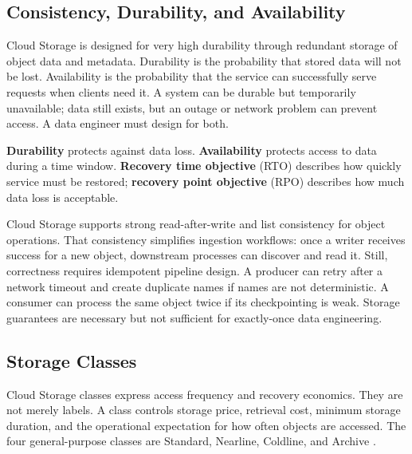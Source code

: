 \subsection{Consistency, Durability, and Availability}
Cloud Storage is designed for very high durability through redundant storage of object data and metadata. Durability is the probability that stored data will not be lost. Availability is the probability that the service can successfully serve requests when clients need it. A system can be durable but temporarily unavailable; data still exists, but an outage or network problem can prevent access. A data engineer must design for both.

\begin{definitionbox}
\textbf{Durability} protects against data loss. \textbf{Availability} protects access to data during a time window. \textbf{Recovery time objective} (RTO) describes how quickly service must be restored; \textbf{recovery point objective} (RPO) describes how much data loss is acceptable.
\end{definitionbox}

Cloud Storage supports strong read-after-write and list consistency for object operations. That consistency simplifies ingestion workflows: once a writer receives success for a new object, downstream processes can discover and read it. Still, correctness requires idempotent pipeline design. A producer can retry after a network timeout and create duplicate names if names are not deterministic. A consumer can process the same object twice if its checkpointing is weak. Storage guarantees are necessary but not sufficient for exactly-once data engineering.

\subsection{Storage Classes}
Cloud Storage classes express access frequency and recovery economics. They are not merely labels. A class controls storage price, retrieval cost, minimum storage duration, and the operational expectation for how often objects are accessed. The four general-purpose classes are Standard, Nearline, Coldline, and Archive \cite{googlecloudstorageoverview}.

